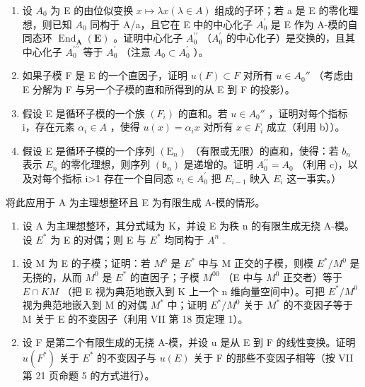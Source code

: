 \begin{enumerate}
\def\labelenumi{\alph{enumi})}
\item
  设 \(A_{0}\) 为 E 的由位似变换 \(x \mapsto \lambda x (\lambda \in A)\) 组成的子环；若 a 是 E 的零化理想，则已知 \(A_{0}\) 同构于 A/a，且它在 E 中的中心化子 \(A_{0}^{\prime}\) 是 E 作为 A-模的自同态环 \(\operatorname{End}_{\mathbf{A}}(\mathbf{E})\) 。证明中心化子 \(A_{0}^{\prime\prime}\) （\(A_{0}^{\prime}\) 的中心化子）是交换的，且其中心化子 \(A_{0}^{\prime\prime\prime}\) 等于 \(A_{0}^{\prime}\) （注意 \(A_{0} \subset A_{0}^{\prime}\) ）。
\item
  如果子模 F 是 E 的一个直因子，证明 \(u(F) \subset F\) 对所有 \(u \in A_{0}''\) （考虑由 E 分解为 F 与另一个子模的直和所得到的从 E 到 F 的投影）。
\item
  假设 E 是循环子模的一个族 \((F_{i})\) 的直和。若 \(u \in A_{0}''\) ，证明对每个指标 i，存在元素 \(\alpha_{i} \in A\) ，使得 \(u(x) = \alpha_{i}x\) 对所有 \(x \in F_{i}\) 成立（利用 b））。
\item
  假设 E 是循环子模的一个序列 \((\mathrm{E}_{n})\) （有限或无限）的直和，使得：若 \(b_{n}\) 表示 \(E_{n}\) 的零化理想，则序列 \((\mathfrak{b}_{n})\) 是递增的。证明 \(A_{0}^{\prime\prime}=A_{0}\) （利用 c)，以及对每个指标 i\textgreater1 存在一个自同态 \(v_{i}\in A_{0}^{\prime}\) 把 \(E_{i-1}\) 映入 \(E_{i}\) 这一事实。）
\end{enumerate}

将此应用于 A 为主理想整环且 E 为有限生成 A-模的情形。

\begin{enumerate}
\def\labelenumi{\arabic{enumi})}
\setcounter{enumi}{6}
\tightlist
\item
  设 A 为主理想整环，其分式域为 K，并设 E 为秩 n 的有限生成无挠 A-模。设 \(E^{*}\) 为 E 的对偶；则 E 与 \(E^{*}\) 均同构于 \(A^{n}\) .
\end{enumerate}

\begin{enumerate}
\def\labelenumi{\alph{enumi})}
\item
  设 M 为 E 的子模；证明：若 \(M^{0}\) 是 \(E^{*}\) 中与 M 正交的子模，则模 \(E^{*}/M^{0}\) 是无挠的，从而 \(M^{0}\) 是 \(E^{*}\) 的直因子；子模 \(M^{00}\) （E 中与 \(M^{0}\) 正交者）等于 \(E \cap KM\) （把 E 视为典范地嵌入到 K 上一个 n 维向量空间中）。可把 \(E^{*}/M^{0}\) 视为典范地嵌入到 M 的对偶 \(M^{*}\) 中；证明 \(E^{*}/M^{0}\) 关于 \(M^{*}\) 的不变因子等于 M 关于 E 的不变因子（利用 VII 第 18 页定理 1）。
\item
  设 F 是第二个有限生成的无挠 A-模，并设 u 是从 E 到 F 的线性变换。证明 \(u(F^{*})\) 关于 \(E^{*}\) 的不变因子与 \(u(E)\) 关于 F 的那些不变因子相等（按 VII 第 21 页命题 5 的方式进行）。
\end{enumerate}


